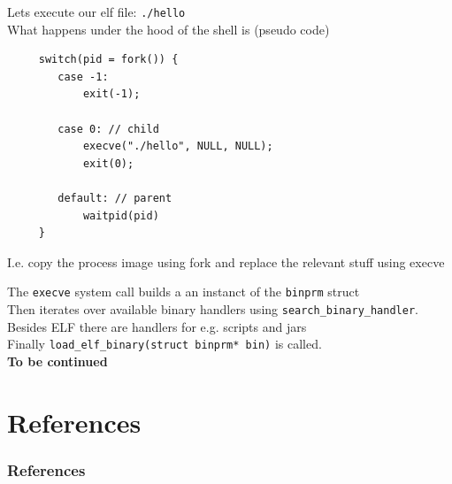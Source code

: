 \documentclass[10pt]{beamer}
\begin{document}
\begin{frame}{}
    Lets execute our elf file: \texttt{./hello}\\
    What happens under the hood of the shell is (pseudo code)
    \begin{verbatim}
     switch(pid = fork()) {
        case -1: 
            exit(-1);
            
        case 0: // child
            execve("./hello", NULL, NULL);
            exit(0);
            
        default: // parent
            waitpid(pid)
     }
    \end{verbatim}
    I.e. copy the process image using fork and replace the relevant stuff using execve
    \framebreak
    
    The \texttt{execve} system call builds a an instanct of the \texttt{binprm} struct \vspace{0.35cm} \\
    Then iterates over available binary handlers using \texttt{search_binary_handler}. \vspace{0.35cm}\\
    Besides ELF there are handlers for e.g. scripts and jars \\
    Finally \texttt{load_elf_binary(struct binprm* bin)} is called. \vspace{0.35cm} \\
    
    \textbf{To be continued}
    
\end{frame}

\section{References}
    \begin{frame}[allowframebreaks]
      \frametitle{References}
      \begin{tiny}
      \nocite{*}
      \printbibliography
      \end{tiny}
    \end{frame}
\end{document}
